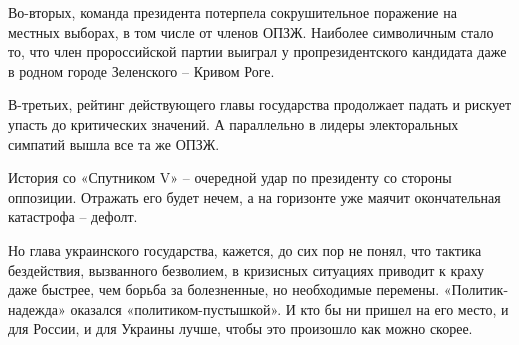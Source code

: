 Во-вторых, команда президента потерпела сокрушительное поражение на местных
выборах, в том числе от членов ОПЗЖ. Наиболее символичным стало то, что член
пророссийской партии выиграл у пропрезидентского кандидата даже в родном городе
Зеленского – Кривом Роге.

В-третьих, рейтинг действующего главы государства продолжает падать и рискует
упасть до критических значений. А параллельно в лидеры электоральных симпатий
вышла все та же ОПЗЖ.

История со «Спутником V» – очередной удар по президенту со стороны оппозиции.
Отражать его будет нечем, а на горизонте уже маячит окончательная катастрофа –
дефолт.

Но глава украинского государства, кажется, до сих пор не понял, что тактика
бездействия, вызванного безволием, в кризисных ситуациях приводит к краху даже
быстрее, чем борьба за болезненные, но необходимые перемены. «Политик-надежда»
оказался «политиком-пустышкой». И кто бы ни пришел на его место, и для России,
и для Украины лучше, чтобы это произошло как можно скорее.

